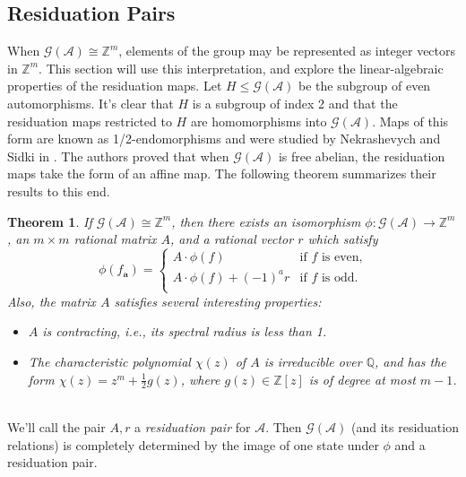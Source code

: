 \documentclass[12pt, letterpaper]{article}
\newcommand{\Z}{\mathbb Z}
\newcommand{\Q}{\mathbb Q}
\newcommand{\A}{\mathcal A}
\newcommand{\ch}[1]{\mathbf{#1}}
\newcommand{\res}[2]{{{#1}_{\ch{#2}}}}
\newcommand{\gp}{\mathcal G}
\newtheorem{thm}{Theorem}[section]
\begin{document}
\subsection{Residuation Pairs}\label{sec:matrix_rep}
When $\gp(\A) \cong \Z^m$, elements of the group may be represented as integer
vectors in $\Z^m$. This section will use this interpretation, and explore the
linear-algebraic properties of the residuation maps.  Let $H \le \gp(\A)$ be
the subgroup of even automorphisms. It's clear that $H$ is a subgroup of index
2 and that the residuation maps restricted to $H$ are homomorphisms into
$\gp(\A)$. Maps of this form are known as 1/2-endomorphisms and were studied by
Nekrashevych and Sidki in \cite{nekrashevych2004automorphisms}. The authors
proved that when $\gp(\A)$ is free abelian, the residuation maps take the form
of an affine map. The following theorem summarizes their results to this end.
\begin{thm}\label{thm:nekrashevych_sidki}
    If $\gp(\A) \cong \Z^m$, then there exists an isomorphism $\phi : \gp(\A)
    \rightarrow \Z^m$, an $m \times m$ rational matrix $A$, and a rational
    vector $r$ which satisfy
    \begin{equation}\label{eq:Aresiduals}
        \phi(\res{f}{a}) = \begin{cases}
            A \cdot \phi(f) & \text{if $f$ is even,}\\
            A \cdot \phi(f) + (-1)^a r &
            \text{if $f$ is odd.}\\
        \end{cases}
    \end{equation}
    Also, the matrix $A$ satisfies several interesting properties:
    \begin{itemize}
        \item $A$ is contracting, i.e., its spectral radius is less than 1.
        \item The characteristic polynomial $\chi(z)$ of $A$ is irreducible
            over $\Q$, and has the form $\chi(z) = z^m + \frac{1}{2}g(z)$,
            where $g(z) \in \Z[z]$ is of degree at most $m-1$.
    \end{itemize}
\end{thm}\hfill\\
We'll call the pair $A, r$ a \emph{residuation pair} for $\A$.  Then $\gp(\A)$
(and its residuation relations) is completely determined by the image of one
state under $\phi$ and a residuation pair.
\end{document}

